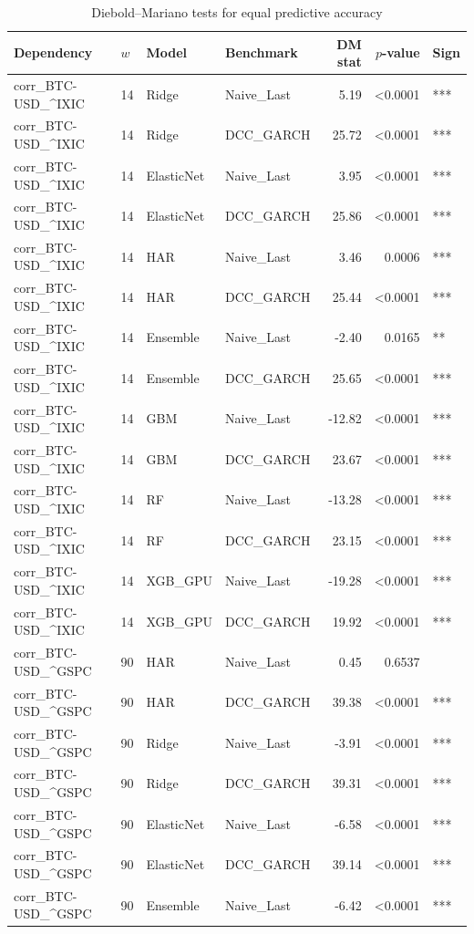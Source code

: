 \begin{table}[H]
\centering
\small
\caption{Diebold--Mariano tests for equal predictive accuracy}
\label{tab:dm_tests}
\begin{tabular}{llllrrl}
\toprule
Dependency & $w$ & Model & Benchmark & DM stat & $p$-value & Sign \\
\midrule
corr_BTC-USD_^IXIC & 14 & Ridge & Naive_Last & 5.19 & <0.0001 & *** \\
corr_BTC-USD_^IXIC & 14 & Ridge & DCC_GARCH & 25.72 & <0.0001 & *** \\
corr_BTC-USD_^IXIC & 14 & ElasticNet & Naive_Last & 3.95 & <0.0001 & *** \\
corr_BTC-USD_^IXIC & 14 & ElasticNet & DCC_GARCH & 25.86 & <0.0001 & *** \\
corr_BTC-USD_^IXIC & 14 & HAR & Naive_Last & 3.46 & 0.0006 & *** \\
corr_BTC-USD_^IXIC & 14 & HAR & DCC_GARCH & 25.44 & <0.0001 & *** \\
corr_BTC-USD_^IXIC & 14 & Ensemble & Naive_Last & -2.40 & 0.0165 & ** \\
corr_BTC-USD_^IXIC & 14 & Ensemble & DCC_GARCH & 25.65 & <0.0001 & *** \\
corr_BTC-USD_^IXIC & 14 & GBM & Naive_Last & -12.82 & <0.0001 & *** \\
corr_BTC-USD_^IXIC & 14 & GBM & DCC_GARCH & 23.67 & <0.0001 & *** \\
corr_BTC-USD_^IXIC & 14 & RF & Naive_Last & -13.28 & <0.0001 & *** \\
corr_BTC-USD_^IXIC & 14 & RF & DCC_GARCH & 23.15 & <0.0001 & *** \\
corr_BTC-USD_^IXIC & 14 & XGB_GPU & Naive_Last & -19.28 & <0.0001 & *** \\
corr_BTC-USD_^IXIC & 14 & XGB_GPU & DCC_GARCH & 19.92 & <0.0001 & *** \\
corr_BTC-USD_^GSPC & 90 & HAR & Naive_Last & 0.45 & 0.6537 &  \\
corr_BTC-USD_^GSPC & 90 & HAR & DCC_GARCH & 39.38 & <0.0001 & *** \\
corr_BTC-USD_^GSPC & 90 & Ridge & Naive_Last & -3.91 & <0.0001 & *** \\
corr_BTC-USD_^GSPC & 90 & Ridge & DCC_GARCH & 39.31 & <0.0001 & *** \\
corr_BTC-USD_^GSPC & 90 & ElasticNet & Naive_Last & -6.58 & <0.0001 & *** \\
corr_BTC-USD_^GSPC & 90 & ElasticNet & DCC_GARCH & 39.14 & <0.0001 & *** \\
corr_BTC-USD_^GSPC & 90 & Ensemble & Naive_Last & -6.42 & <0.0001 & *** \\

\end{tabular}
\end{table}
